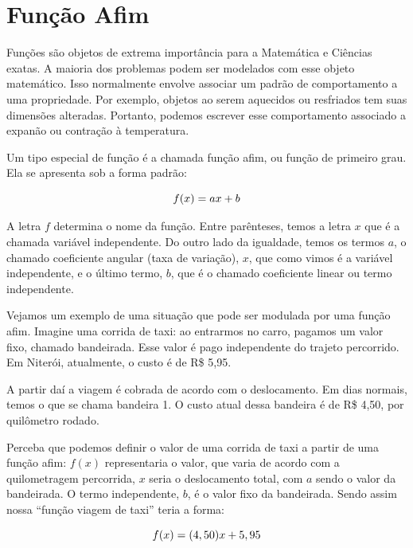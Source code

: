 \documentclass[12pt, a4paper, brazil]{abntex2}
\begin{document}
    \textual\pagestyle{myHeader}
    \section*{Função Afim}
    \vspace{8pt}

    Funções são objetos de extrema importância para a Matemática e Ciências exatas. A maioria dos problemas podem ser modelados com esse objeto matemático. Isso normalmente envolve associar um padrão de comportamento a uma propriedade. Por exemplo, objetos ao serem aquecidos ou resfriados tem suas dimensões alteradas. Portanto, podemos escrever esse comportamento associado a expanão ou contração à temperatura.

    Um tipo especial de função é a chamada função afim, ou função de primeiro grau. Ela se apresenta sob a forma padrão:

    \begin{equation}
        f(x) = ax + b
        \vspace{6pt}
    \end{equation}

    A letra $f$ determina o nome da função. Entre parênteses, temos a letra $x$ que é a chamada variável independente. Do outro lado da igualdade, temos os termos $a$, o chamado coeficiente angular (taxa de variação), $x$, que como vimos é a variável independente, e o último termo, $b$, que é o chamado coeficiente linear ou termo independente.
    
    Vejamos um exemplo de uma situação que pode ser modulada por uma função afim. Imagine uma corrida de taxi: ao entrarmos no carro, pagamos um valor fixo, chamado bandeirada. Esse valor é pago independente do trajeto percorrido. Em Niterói, atualmente, o custo é de R\$ 5,95.

    A partir daí a viagem é cobrada de acordo com o deslocamento. Em dias normais, temos o que se chama bandeira 1. O custo atual dessa bandeira é de R\$ 4,50, por quilômetro rodado.

    Perceba que podemos definir o valor de uma corrida de taxi a partir de uma função afim: $f(x)$ representaria o valor, que varia de acordo com a quilometragem percorrida, $x$ seria o deslocamento total, com $a$ sendo o valor da bandeirada. O termo independente, $b$, é o valor fixo da bandeirada. Sendo assim nossa ``função viagem de taxi'' teria a forma:
    
        \begin{equation}
            f(x) = (4,50)x + 5,95
            \vspace{6pt}
        \end{equation}
\end{document}
